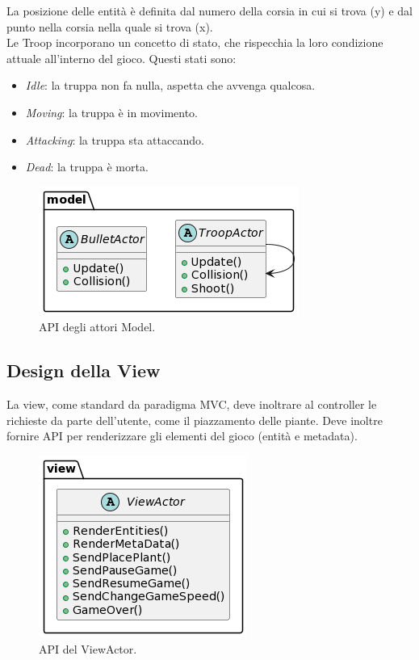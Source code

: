 La posizione delle entità è definita dal numero della corsia in cui si trova (y) e dal punto nella corsia nella quale si trova (x).\\

Le Troop incorporano un concetto di stato, che rispecchia la loro condizione attuale all'interno del gioco. Questi stati sono:
\begin{itemize}
    \item \textit{Idle}: la truppa non fa nulla, aspetta che avvenga qualcosa.
    \item \textit{Moving}: la truppa è in movimento.
    \item \textit{Attacking}: la truppa sta attaccando.
    \item \textit{Dead}: la truppa è morta.
\end{itemize}

\begin{figure}[H]
    \centering
    \includegraphics[width=0.61\linewidth]{images/detail-model.png}
    \caption{API degli attori Model.}
\end{figure}

\newpage

\subsection{Design della View}
La view, come standard da paradigma MVC, deve inoltrare al controller le richieste da parte dell'utente,
come il piazzamento delle piante.
Deve inoltre fornire API per renderizzare gli elementi del gioco (entità e metadata).

\begin{figure}[H]
    \centering
    \includegraphics[width=0.61\linewidth]{images/detail-view.png}
    \caption{API del ViewActor.}
\end{figure}

